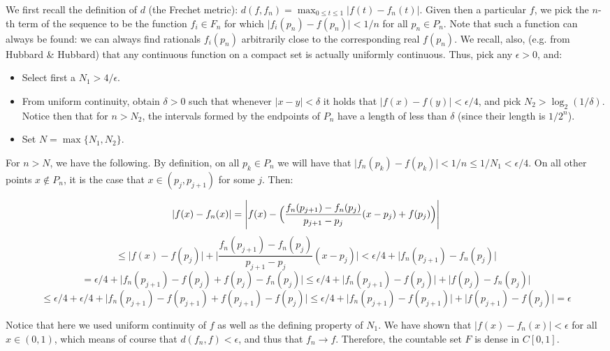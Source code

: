 \begin{solution}
    We first recall the definition of $d$ (the Frechet metric): $d(f, f_n) = \max_{0 \leq t \leq 1} \lvert f(t) - f_n(t) \rvert$. 
    Given then a particular $f$, we pick the $n$-th term of the sequence to be the function $f_i \in F_n$ for which $\lvert f_i(p_n) - f(p_n) \rvert < 1/n$ for all $p_n \in P_n$.
    Note that such a function can always be found: we can always find rationals $f_i(p_n)$ arbitrarily close to the corresponding real $f(p_n)$.
    We recall, also, (e.g. from Hubbard \& Hubbard) that any continuous function on a compact set is actually uniformly continuous.
    Thus, pick any $\epsilon > 0$, and:
    \begin{itemize}
        \item Select first a $N_1 > 4/\epsilon$.
        \item From uniform continuity, obtain $\delta > 0$ such that whenever $\lvert x - y \rvert < \delta$ it holds that $\lvert f(x) - f(y) \rvert < \epsilon/4$, and pick $N_2 > \log_2(1/\delta)$.
        Notice then that for $n > N_2$, the intervals formed by the endpoints of $P_n$ have a length of less than $\delta$ (since their length is $1/2^n$).
        \item Set $N = \max\{N_1, N_2\}$.
    \end{itemize}
    For $n > N$, we have the following.
    By definition, on all $p_k \in P_n$ we will have that $\lvert f_n(p_k) - f(p_k) \rvert < 1/n \leq 1/N_1 < \epsilon/4$.
    On all other points $x \notin P_n$, it is the case that $x \in (p_j, p_{j+1})$ for some $j$.
    Then:

    $$\lvert f(x) - f_n(x) \rvert = \Biggl\lvert f(x) - \Bigl(\frac{f_n(p_{j+1}) - f_n(p_j)}{p_{j+1} - p_j}(x - p_j) + f(p_j)\Bigr) \Biggr\rvert$$
    $$ \leq \lvert f(x) - f(p_j) \rvert + \Biggl\lvert \frac{f_n(p_{j+1}) - f_n(p_j)}{p_{j+1} - p_j}(x - p_j)\Biggr\rvert < \epsilon/4 + \lvert f_n(p_{j+1}) - f_n(p_j) \rvert$$
    $$ = \epsilon/4 + \lvert f_n(p_{j+1}) - f(p_j) + f(p_j) - f_n(p_j) \rvert \leq \epsilon/4 + \lvert f_n(p_{j+1}) - f(p_j) \rvert + \lvert f(p_j) - f_n(p_j) \rvert$$
    $$\leq \epsilon/4 + \epsilon/4 + \lvert f_n(p_{j+1}) - f(p_{j+1}) + f(p_{j+1}) - f(p_j) \rvert \leq \epsilon/4 + \lvert f_n(p_{j+1}) - f(p_{j+1}) \rvert + \lvert f(p_{j+1}) - f(p_j) \rvert = \epsilon$$

    Notice that here we used uniform continuity of $f$ as well as the defining property of $N_1$.
    We have shown that $\lvert f(x) - f_n(x) \rvert < \epsilon$ for all $x \in (0, 1)$, which means of course that $d(f_n, f) < \epsilon$, and thus that $f_n \rightarrow f$.
    Therefore, the countable set $F$ is dense in $C[0, 1]$.
\end{solution}